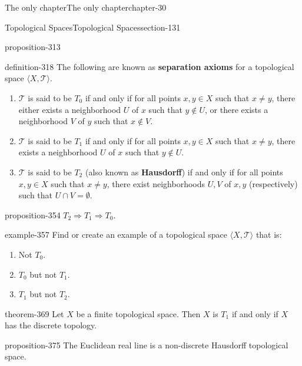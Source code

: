 \documentclass[oneside,10pt,]{book}
\newcommand{\terminology}[1]{\textbf{#1}}
\newcommand{\tuple}[1]{\langle #1 \rangle}
\newcommand{\mc}{\mathcal}
\begin{document}
\begin{chapterptx}{The only chapter}{}{The only chapter}{}{}{chapter-30}
\begin{sectionptx}{Topological Spaces}{}{Topological Spaces}{}{}{section-131}
\begin{proposition}{}{}{proposition-313}
\end{proposition}
\begin{definition}{}{definition-318}%
\hypertarget{p-319}{}%
The following are known as \terminology{separation axioms} for a topological space \(\tuple{X,\mc T}\).%
\leavevmode%
\begin{enumerate}
\item\hypertarget{li-323}{}\(\mc T\) is said to be \terminology{\(T_0\)} if and only if for all points \(x,y\in X\) such that \(x\not=y\), there either exists a neighborhood \(U\) of \(x\) such that \(y\not\in U\), or there exists a neighborhood \(V\) of \(y\) such that \(x\not\in V\).%
\item\hypertarget{li-335}{}\(\mc T\) is said to be \terminology{\(T_1\)} if and only if for all points \(x,y\in X\) such that \(x\not=y\), there exists a neighborhood \(U\) of \(x\) such that \(y\not\in U\).%
\item\hypertarget{li-344}{}\(\mc T\) is said to be \terminology{\(T_2\)} (also known as \terminology{Hausdorff}) if and only if for all points \(x,y\in X\) such that \(x\not=y\), there exist neighborhoods \(U,V\) of \(x,y\) (respectively) such that \(U\cap V=\emptyset\).%
\end{enumerate}
\end{definition}
\begin{proposition}{}{}{proposition-354}%
\hypertarget{p-355}{}%
\(T_2\Rightarrow T_1\Rightarrow T_0\).%
\end{proposition}
\begin{example}{}{example-357}%
\hypertarget{p-358}{}%
Find or create an example of a topological space \(\tuple{X,\mc T}\) that is:%
\leavevmode%
\begin{enumerate}
\item\hypertarget{li-361}{}Not \(T_0\).%
\item\hypertarget{li-363}{}\(T_0\) but not \(T_1\).%
\item\hypertarget{li-366}{}\(T_1\) but not \(T_2\).%
\end{enumerate}
\end{example}
\begin{theorem}{}{}{theorem-369}%
\hypertarget{p-370}{}%
Let \(X\) be a finite topological space. Then \(X\) is \(T_1\) if and only if \(X\) has the discrete topology.%
\end{theorem}
\begin{proposition}{}{}{proposition-375}%
\hypertarget{p-376}{}%
The Euclidean real line is a non-discrete Hausdorff topological space.%

\end{proposition}
\end{sectionptx}
\end{chapterptx}
\end{document}
